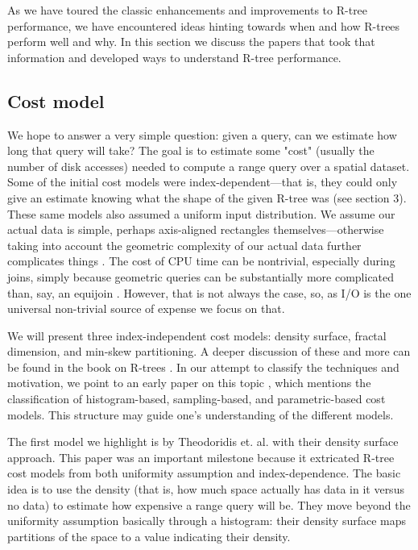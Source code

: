 As we have toured the classic enhancements and improvements to R-tree performance, we have encountered ideas hinting towards when and how R-trees perform well and why.
In this section we discuss the papers that took that information and developed ways to understand R-tree performance.

\subsection{Cost model}
We hope to answer a very simple question: given a query, can we estimate how long that query will take?
The goal is to estimate some "cost" (usually the number of disk accesses) needed to compute a range query over a spatial dataset.
Some of the initial cost models were index-dependent---that is, they could only give an estimate knowing what the shape of the given R-tree was \cite{theodoridisstefanakissellis00} (see section 3).
These same models also assumed a uniform input distribution.
We assume our actual data is simple, perhaps axis-aligned rectangles themselves---otherwise taking into account the geometric complexity of our actual data further complicates things \cite{aboulnaganaughton00}.
The cost of CPU time can be nontrivial, especially during joins, simply because geometric queries can be substantially more complicated than, say, an equijoin \cite{theodoridisstefanakissellis00}.
However, that is not always the case, so, as I/O is the one universal non-trivial source of expense we focus on that.

We will present three index-independent cost models: density surface, fractal dimension, and min-skew partitioning.
A deeper discussion of these and more can be found in the book on R-trees \cite{thebook}.
In our attempt to classify the techniques and motivation, we point to an early paper on this topic \cite{acharyapoosalaramaswamy99}, which mentions the classification of histogram-based, sampling-based, and parametric-based cost models. This structure may guide one's understanding of the different models.

The first model we highlight is by Theodoridis et. al. \cite{theodoridissellis96,theodoridisstefanakissellis00} with their density surface approach.
This paper was an important milestone because it extricated R-tree cost models from both uniformity assumption and index-dependence.
The basic idea is to use the density (that is, how much space actually has data in it versus no data) to estimate how expensive a range query will be.
They move beyond the uniformity assumption basically through a histogram: their density surface maps partitions of the space to a value indicating their density.

